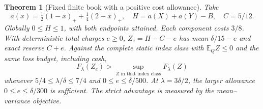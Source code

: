 \documentclass[11pt,a4paper]{amsart}
\theoremstyle{plain}
\newtheorem{theorem}{Theorem}[section]
\theoremstyle{definition}
\theoremstyle{remark}
\newcommand{\EE}{\mathbb{E}}
\begin{document}
\begin{theorem}[Fixed finite book with a positive cost allowance]\label{thm:finitewitness}
Take
\begin{equation}\label{eq:fixedbook}
 a(x)=\tfrac12(1-x)_++\tfrac14(2-x)_+,\quad
 H=a(X)+a(Y)-B,\quad C=5/12.
\end{equation}
Globally $0\le H\le1$, with both endpoints attained. Each component costs $3/8$. With deterministic total charges $e\ge0$, $Z_e=H-C-e$ has mean $\delta/15-e$ and exact reserve $C+e$. Against the complete static index class with $\EE_QZ\le0$ and the same loss budget, including cash,
\[
 F_\lambda(Z_e)>\sup_{Z\text{ in that index class}}F_\lambda(Z)
\]
whenever $5/4\le\lambda/\delta\le7/4$ and $0\le e\le\delta/500$. At $\lambda=3\delta/2$, the larger allowance $0\le e\le\delta/300$ is sufficient. The strict advantage is measured by the mean--variance objective.
\end{theorem}
\end{document}
